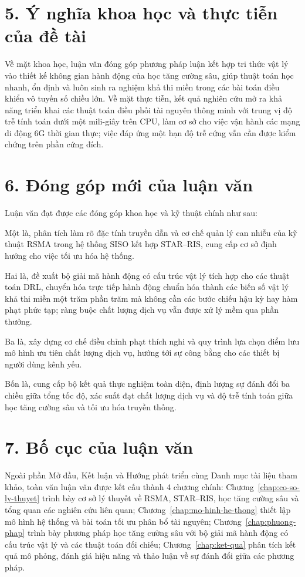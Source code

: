 \section*{5. Ý nghĩa khoa học và thực tiễn của đề tài}

Về mặt khoa học, luận văn đóng góp phương pháp luận kết hợp tri thức vật lý vào thiết kế không gian hành
động của học tăng cường sâu, giúp thuật toán học nhanh, ổn định và luôn sinh ra nghiệm khả thi miền trong
các bài toán điều khiển vô tuyến số chiều lớn. Về mặt thực tiễn, kết quả nghiên cứu mở ra khả năng triển
khai các thuật toán điều phối tài nguyên thông minh với trung vị độ trễ tính toán dưới một mili-giây trên
CPU, làm cơ sở cho việc vận hành các mạng di động 6G thời gian thực; việc đáp ứng một hạn độ trễ cứng vẫn
cần được kiểm chứng trên phần cứng đích.

\section*{6. Đóng góp mới của luận văn}

Luận văn đạt được các đóng góp khoa học và kỹ thuật chính như sau:

Một là, phân tích làm rõ đặc tính truyền dẫn và cơ chế quản lý can nhiễu của kỹ thuật RSMA trong hệ
thống SISO kết hợp STAR--RIS, cung cấp cơ sở định hướng cho việc tối ưu hóa hệ thống.

Hai là, đề xuất bộ giải mã hành động có cấu trúc vật lý tích hợp cho các thuật toán DRL, chuyển hóa trực
tiếp hành động chuẩn hóa thành các biến số vật lý khả thi miền một trăm phần trăm mà không cần các bước
chiếu hậu kỳ hay hàm phạt phức tạp; ràng buộc chất lượng dịch vụ vẫn được xử lý mềm qua phần thưởng.

Ba là, xây dựng cơ chế điều chỉnh phạt thích nghi và quy trình lựa chọn điểm lưu mô hình ưu tiên chất
lượng dịch vụ, hướng tới sự công bằng cho các thiết bị người dùng kênh yếu.

Bốn là, cung cấp bộ kết quả thực nghiệm toàn diện, định lượng sự đánh đổi ba chiều giữa tổng tốc độ, xác
suất đạt chất lượng dịch vụ và độ trễ tính toán giữa học tăng cường sâu và tối ưu hóa truyền thống.

\section*{7. Bố cục của luận văn}

Ngoài phần Mở đầu, Kết luận và Hướng phát triển cùng Danh mục tài liệu tham khảo, toàn văn luận văn được
kết cấu thành 4 chương chính: Chương~\ref{chap:co-so-ly-thuyet} trình bày cơ sở lý thuyết về RSMA,
STAR--RIS, học tăng cường sâu và tổng quan các nghiên cứu liên quan; Chương~\ref{chap:mo-hinh-he-thong}
thiết lập mô hình hệ thống và bài toán tối ưu phân bổ tài nguyên; Chương~\ref{chap:phuong-phap} trình bày
phương pháp học tăng cường sâu với bộ giải mã hành động có cấu trúc vật lý và các thuật toán đối chiếu;
Chương~\ref{chap:ket-qua} phân tích kết quả mô phỏng, đánh giá hiệu năng và thảo luận về sự đánh đổi giữa
các phương pháp.
